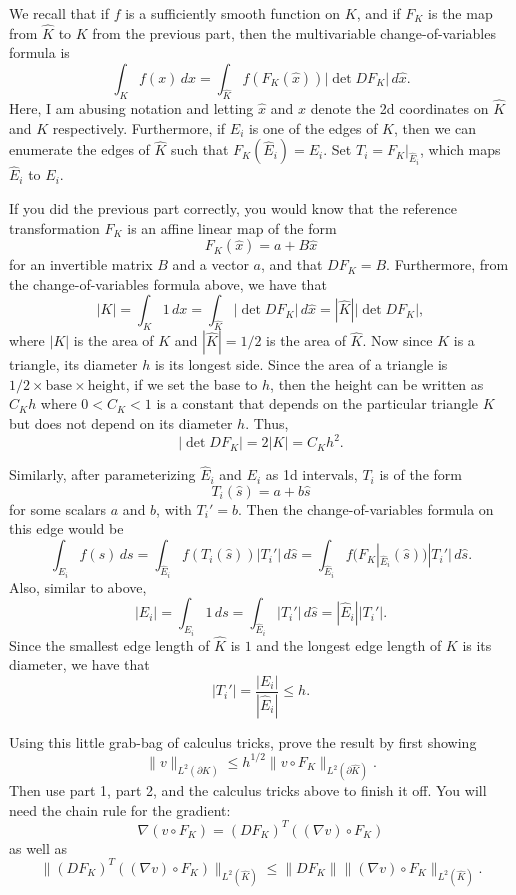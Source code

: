 \documentclass{article}
\theoremstyle{definition}
\theoremstyle{plain}
\theoremstyle{remark}
\begin{document}
We recall that if $f$ is a sufficiently smooth function on $K$, and if $F_K$ is the map from $\widehat K$ to $K$ from the previous part, then the multivariable change-of-variables formula is
\begin{equation*}
	\int_K f(x)\,dx = \int_{\widehat K}f(F_K(\widehat x))|\det DF_K|\,d\widehat x.
\end{equation*}
Here, I am abusing notation and letting $\widehat x$ and $x$ denote the 2d coordinates on $\widehat K$ and $K$ respectively.
Furthermore, if $E_i$ is one of the edges of $K$, then we can enumerate the edges of $\widehat K$ such that $F_K(\widehat E_i) = E_i$.
Set $T_i = F_K|_{\widehat E_i}$, which maps $\widehat E_i$ to $E_i$.

If you did the previous part correctly, you would know that the reference transformation $F_K$ is an affine linear map of the form
\[F_K(\widehat x) = a + B\widehat x\]
for an invertible matrix $B$ and a vector $a$, and that $DF_K = B$.
Furthermore, from the change-of-variables formula above, we have that
\[|K| = \int_K1\,dx = \int_{\widehat K}|\det DF_K|\,d\widehat x = |\widehat K||\det DF_K|,\]
where $|K|$ is the area of $K$ and $|\widehat K| = 1/2$ is the area of $\widehat K$.
Now since $K$ is a triangle, its diameter $h$ is its longest side.
Since the area of a triangle is $1/2 \times \text{base} \times \text{height}$, if we set the base to $h$, then the height can be written as $C_K h$ where $0 < C_K < 1$ is a constant that depends on the particular triangle $K$ but does not depend on its diameter $h$.
Thus,
\begin{equation*}
	|\det DF_K| = 2|K| = C_Kh^2.
\end{equation*}

Similarly, after parameterizing $\widehat E_i$ and $E_i$ as 1d intervals, $T_i$ is of the form
\[T_i(\widehat s) = a + b\widehat s\]
for some scalars $a$ and $b$, with $T_i' = b$.
Then the change-of-variables formula on this edge would be
\begin{equation*}
	\int_{E_i} f(s)\,ds = \int_{\widehat E_i}f(T_i(\widehat s))|T_i'|\,d\widehat s = \int_{\widehat E_i}f(F_K|_{\widehat E_i}(\widehat s))|T_i'|\,d\widehat s.
\end{equation*}
Also, similar to above,
\[|E_i| = \int_{E_i}1\,ds = \int_{\widehat E_i}|T_i'|\,d\widehat s = |\widehat E_i||T_i'|.\]
Since the smallest edge length of $\widehat K$ is $1$ and the longest edge length of $K$ is its diameter, we have that
\[|T_i'| = \frac{|E_i|}{|\widehat E_i|} \leq h.\]

Using this little grab-bag of calculus tricks, prove the result by first showing
\begin{equation*}
	\|v\|_{L^2(\partial K)} \leq h^{1/2}\|v\circ F_K\|_{L^2(\partial \widehat K)}.
\end{equation*}
Then use part 1, part 2, and the calculus tricks above to finish it off.
You will need the chain rule for the gradient:
\begin{equation*}
	\nabla(v \circ F_K) = (DF_K)^T((\nabla v)\circ F_K)
\end{equation*}
as well as
\begin{equation*}
	\|(DF_K)^T((\nabla v)\circ F_K)\|_{L^2(\widehat K)} \leq \|DF_K\|\|(\nabla v)\circ F_K\|_{L^2(\widehat K)}.
\end{equation*}
\end{document}
